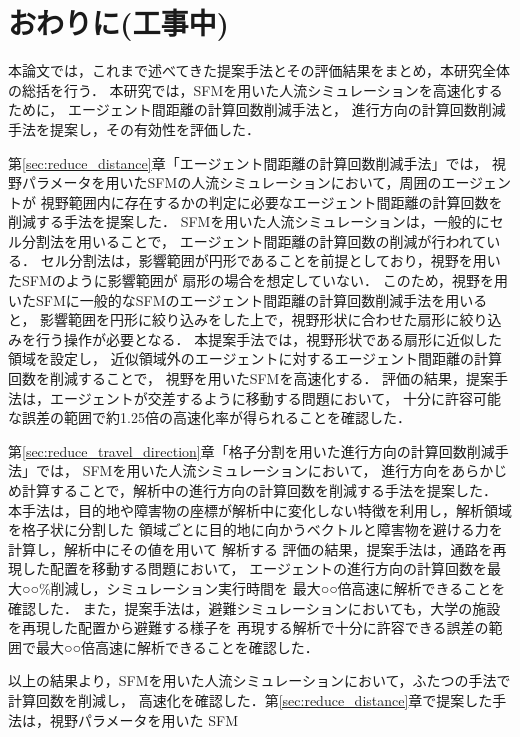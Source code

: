 \chapter{おわりに(工事中)}
\label{sec:discuss}
本論文では，これまで述べてきた提案手法とその評価結果をまとめ，本研究全体の総括を行う．
本研究では，SFMを用いた人流シミュレーションを高速化するために，
エージェント間距離の計算回数削減手法と，
進行方向の計算回数削減手法を提案し，その有効性を評価した．

第\ref{sec:reduce_distance}章「エージェント間距離の計算回数削減手法」では，
視野パラメータを用いたSFMの人流シミュレーションにおいて，周囲のエージェントが
視野範囲内に存在するかの判定に必要なエージェント間距離の計算回数を削減する手法を提案した．
SFMを用いた人流シミュレーションは，一般的にセル分割法を用いることで，
エージェント間距離の計算回数の削減が行われている．
セル分割法は，影響範囲が円形であることを前提としており，視野を用いたSFMのように影響範囲が
扇形の場合を想定していない．
このため，視野を用いたSFMに一般的なSFMのエージェント間距離の計算回数削減手法を用いると，
影響範囲を円形に絞り込みをした上で，視野形状に合わせた扇形に絞り込みを行う操作が必要となる．
本提案手法では，視野形状である扇形に近似した領域を設定し，
近似領域外のエージェントに対するエージェント間距離の計算回数を削減することで，
視野を用いたSFMを高速化する．
評価の結果，提案手法は，エージェントが交差するように移動する問題において，
十分に許容可能な誤差の範囲で約1.25倍の高速化率が得られることを確認した．


第\ref{sec:reduce_travel_direction}章「格子分割を用いた進行方向の計算回数削減手法」では，
SFMを用いた人流シミュレーションにおいて，
進行方向をあらかじめ計算することで，解析中の進行方向の計算回数を削減する手法を提案した．
本手法は，目的地や障害物の座標が解析中に変化しない特徴を利用し，解析領域を格子状に分割した
領域ごとに目的地に向かうベクトルと障害物を避ける力を計算し，解析中にその値を用いて
解析する
評価の結果，提案手法は，通路を再現した配置を移動する問題において，
エージェントの進行方向の計算回数を最大○○\%削減し，シミュレーション実行時間を
最大○○倍高速に解析できることを確認した．
また，提案手法は，避難シミュレーションにおいても，大学の施設を再現した配置から避難する様子を
再現する解析で十分に許容できる誤差の範囲で最大○○倍高速に解析できることを確認した．

以上の結果より，SFMを用いた人流シミュレーションにおいて，ふたつの手法で計算回数を削減し，
高速化を確認した．第\ref{sec:reduce_distance}章で提案した手法は，視野パラメータを用いた
SFM

